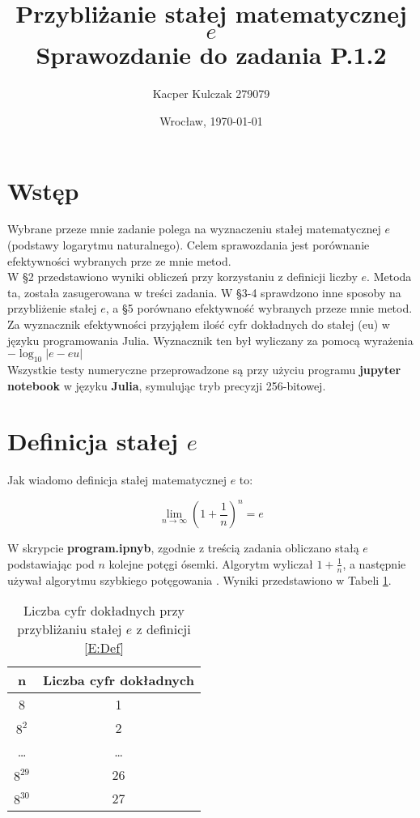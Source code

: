 \documentclass{article}
\author{Kacper Kulczak 279079}
\date{Wrocław, \today}
\title{\textbf{Przybliżanie stałej matematycznej $e$ } \\ Sprawozdanie do zadania P.1.2}
\begin{document}
\maketitle
\section{Wstęp}

Wybrane przeze mnie zadanie polega na wyznaczeniu stałej matematycznej $e$ (podstawy logarytmu naturalnego). Celem sprawozdania jest porównanie efektywności wybranych prze ze mnie metod.
\\ \indent
 W \S 2 przedstawiono wyniki obliczeń przy korzystaniu z definicji liczby $e$. Metoda ta, została zasugerowana w treści zadania. W \S 3-4 sprawdzono inne sposoby na przybliżenie stałej $e$, a  \S 5 porównano efektywność wybranych przeze mnie metod.
 \\ \indent
  Za wyznacznik efektywności przyjąłem ilość cyfr dokładnych do stałej (eu) w języku programowania Julia. Wyznacznik ten był wyliczany za pomocą wyrażenia $-\log_{10}{|e-eu|}$ 
  \\ \indent
Wszystkie testy numeryczne przeprowadzone są przy użyciu programu \textbf{jupyter notebook} w języku \textbf{Julia}, symulując tryb precyzji 256-bitowej.

\section{Definicja stałej $e$}

Jak wiadomo definicja stałej matematycznej $e$ to:

\begin{equation}\label{E:Def}
\lim_{n\to\infty} \left(1 + \frac{1}{n} \right) ^{n} =  e
\end{equation}

W skrypcie \textbf{program.ipnyb}, zgodnie z treścią zadania obliczano stałą $e$ podstawiając pod $n$ kolejne potęgi ósemki. Algorytm wyliczał $1+\frac{1}{n}$, a następnie używał algorytmu szybkiego potęgowania . Wyniki przedstawiono w Tabeli \ref{Res,def}.

\begin{table}[h]
\centering
	\begin{tabular}{|c|c|} \hline
		n & Liczba cyfr dokładnych \\ \hline
		8 &  1\\
		$8^{2}$ &  2\\
		\dots & \dots \\
		$8^{29}$  &  26 \\
		$8^{30}$ &  27 \\
		\hline
	\end{tabular}
	\caption{Liczba cyfr dokładnych przy przybliżaniu stałej $e$ z definicji \eqref{E:Def}}
	\label{Res,def}
\end{table}
\end{document}

